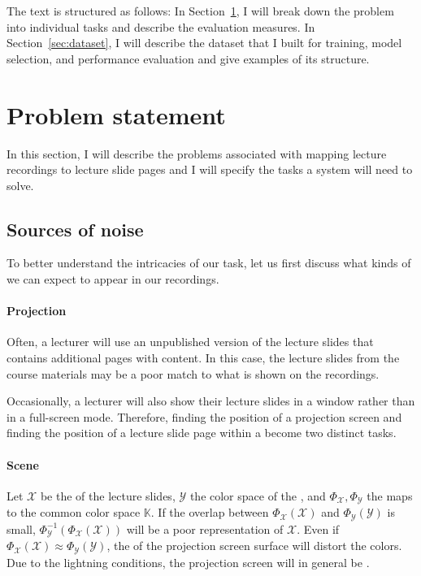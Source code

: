 The text is structured as follows: In Section~\ref{sec:problem}, I will
break down the problem into individual tasks and describe the evaluation
measures. In Section~\ref{sec:dataset}, I will describe the dataset
that I built for training, model selection, and performance evaluation
and give examples of its structure.

\section{Problem statement}
\label{sec:problem}
In this section, I will describe the problems associated with mapping lecture
recordings to lecture slide pages and I will specify the tasks a system will
need to solve.

\subsection{Sources of noise}
\label{sec:noise}
To better understand the intricacies of our task, let us first discuss what
kinds of  we can expect to appear in our recordings.

\paragraph{Projection} Often, a lecturer will use an unpublished version of the
lecture slides that contains additional pages with 
content. In this case, the lecture slides from the course materials may be a
poor match to what is shown on the recordings.

Occasionally, a lecturer will also show their lecture slides in a window rather
than in a full-screen mode. Therefore, finding the position of a projection
screen and finding the position of a lecture slide page within a
 become two distinct tasks.

\paragraph{Scene} Let $\mathcal X$ be the  of the lecture
slides, $\mathcal Y$ the color space of the , and
$\Phi_{\mathcal X},\Phi_{\mathcal Y}$ the maps to the common color space
$\mathbb K$. If the overlap between $\Phi_{\mathcal X}(\mathcal X)$ and
$\Phi_{\mathcal Y}(\mathcal Y)$ is small, $\Phi^{-1}_{\mathcal
Y}(\Phi_{\mathcal X}(\mathcal X))$ will be a poor representation of $\mathcal
X$. Even if $\Phi_{\mathcal X}(\mathcal X)\approx\Phi_{\mathcal Y}(\mathcal
Y)$, the  of the projection screen surface will distort the
colors.
Due to the lightning conditions, the projection screen will in general be
.

